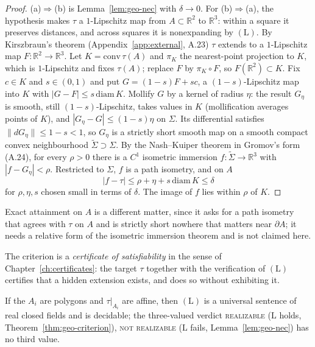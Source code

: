 \begin{proof}
(a)$\Rightarrow$(b) is Lemma~\ref{lem:geo-nec} with $\delta\to0$. For (b)$\Rightarrow$(a), the hypothesis makes $\tau$ a $1$-Lipschitz map from $A\subset\mathbb R^2$ to $\mathbb R^3$: within a square it preserves distances, and across squares it is nonexpanding by $(\mathrm L)$. By Kirszbraun's theorem (Appendix~\ref{app:external}, A.23) $\tau$ extends to a $1$-Lipschitz map $F:\mathbb R^2\to\mathbb R^3$. Let $K=\mathrm{conv}\,\tau(A)$ and $\pi_K$ the nearest-point projection to $K$, which is $1$-Lipschitz and fixes $\tau(A)$; replace $F$ by $\pi_K\circ F$, so $F(\mathbb R^2)\subset K$. Fix $c\in K$ and $s\in(0,1)$ and put $G=(1-s)F+sc$, a $(1-s)$-Lipschitz map into $K$ with $|G-F|\le s\,\mathrm{diam}\,K$. Mollify $G$ by a kernel of radius $\eta$: the result $G_\eta$ is smooth, still $(1-s)$-Lipschitz, takes values in $K$ (mollification averages points of $K$), and $|G_\eta-G|\le(1-s)\eta$ on $\Sigma$. Its differential satisfies $\|dG_\eta\|\le1-s<1$, so $G_\eta$ is a strictly short smooth map on a smooth compact convex neighbourhood $\tilde\Sigma\supset\Sigma$. By the Nash--Kuiper theorem in Gromov's form (A.24), for every $\rho>0$ there is a $C^1$ isometric immersion $f:\tilde\Sigma\to\mathbb R^3$ with $|f-G_\eta|<\rho$. Restricted to $\Sigma$, $f$ is a path isometry, and on $A$
\[
|f-\tau|\le\rho+\eta+s\,\mathrm{diam}\,K\le\delta
\]
for $\rho,\eta,s$ chosen small in terms of $\delta$. The image of $f$ lies within $\rho$ of $K$.
\end{proof}

Exact attainment on $A$ is a different matter, since it asks for a path isometry that agrees with $\tau$ on $A$ and is strictly short nowhere that matters near $\partial A$; it needs a relative form of the isometric immersion theorem and is not claimed here.

The criterion is a \emph{certificate of satisfiability} in the sense of Chapter~\ref{ch:certificates}: the target $\tau$ together with the verification of $(\mathrm L)$ certifies that a hidden extension exists, and does so without exhibiting it.

\begin{proposition}[Decidability]
\label{prop:geo-decid}
If the $A_i$ are polygons and $\tau|_{A_i}$ are affine, then $(\mathrm L)$ is a universal sentence of real closed fields and is decidable; the three-valued verdict \textsc{realizable} ($\mathrm L$ holds, Theorem~\ref{thm:geo-criterion}), \textsc{not realizable} ($\mathrm L$ fails, Lemma~\ref{lem:geo-nec}) has no third value.
\end{proposition}

